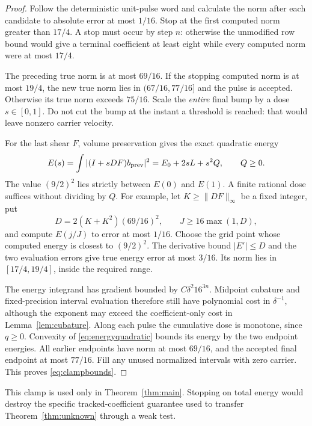 \documentclass[11pt,a4paper]{amsart}
\theoremstyle{definition}
\theoremstyle{remark}
\numberwithin{equation}{section}
\newcommand{\norm}[1]{\lVert #1\rVert}
\begin{document}
\begin{proof}
Follow the deterministic unit-pulse word and calculate the norm after each candidate to absolute error at most $1/16$. Stop at the first computed norm greater than $17/4$. A stop must occur by step $n$: otherwise the unmodified row bound would give a terminal coefficient at least eight while every computed norm were at most $17/4$.

The preceding true norm is at most $69/16$. If the stopping computed norm is at most $19/4$, the new true norm lies in $(67/16,77/16]$ and the pulse is accepted. Otherwise its true norm exceeds $75/16$. Scale the \emph{entire} final bump by a dose $s\in[0,1]$. Do not cut the bump at the instant a threshold is reached: that would leave nonzero carrier velocity.

For the last shear $F$, volume preservation gives the exact quadratic energy
\begin{equation}\label{eq:energyquadratic}
 E(s)=\int|(I+sDF)b_{\rm prev}|^2
 =E_0+2sL+s^2Q,\qquad Q\ge0.
\end{equation}
The value $(9/2)^2$ lies strictly between $E(0)$ and $E(1)$. A finite rational dose suffices without dividing by $Q$. For example, let $K\ge\norm{DF}_\infty$ be a fixed integer, put
\[
 D=2(K+K^2)(69/16)^2,\qquad J\ge16\max(1,D),
\]
and compute $E(j/J)$ to error at most $1/16$. Choose the grid point whose computed energy is closest to $(9/2)^2$. The derivative bound $|E'|\le D$ and the two evaluation errors give true energy error at most $3/16$. Its norm lies in $[17/4,19/4]$, inside the required range.

The energy integrand has gradient bounded by $C\delta^2 16^{3n}$. Midpoint cubature and fixed-precision interval evaluation therefore still have polynomial cost in $\delta^{-1}$, although the exponent may exceed the coefficient-only cost in Lemma~\ref{lem:cubature}. Along each pulse the cumulative dose is monotone, since $q\ge0$. Convexity of \eqref{eq:energyquadratic} bounds its energy by the two endpoint energies. All earlier endpoints have norm at most $69/16$, and the accepted final endpoint at most $77/16$. Fill any unused normalized intervals with zero carrier. This proves \eqref{eq:clampbounds}.
\end{proof}

This clamp is used only in Theorem~\ref{thm:main}. Stopping on total energy would destroy the specific tracked-coefficient guarantee used to transfer Theorem~\ref{thm:unknown} through a weak test.
\end{document}
